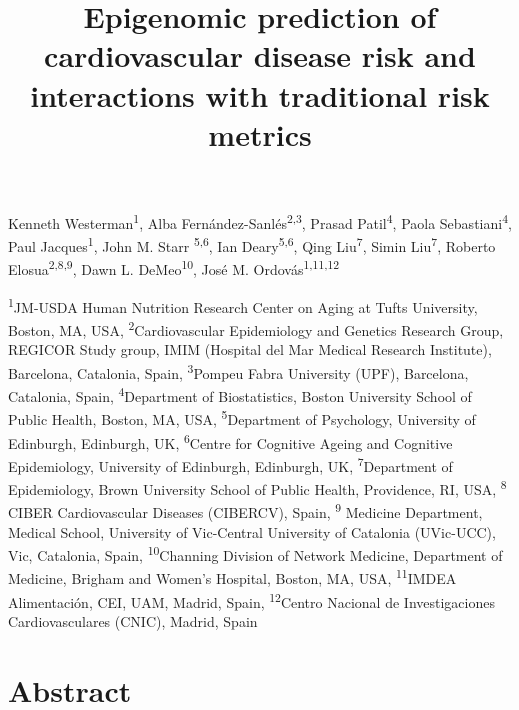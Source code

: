 \documentclass[]{article}
\title{Epigenomic prediction of cardiovascular disease risk and interactions
with traditional risk metrics}
\author{}
\date{}
\begin{document}
\maketitle

Kenneth Westerman\textsuperscript{1}, Alba
Fernández-Sanlés\textsuperscript{2,3}, Prasad Patil\textsuperscript{4},
Paola Sebastiani\textsuperscript{4}, Paul Jacques\textsuperscript{1},
John M. Starr \textsuperscript{5,6}, Ian Deary\textsuperscript{5,6},
Qing Liu\textsuperscript{7}, Simin Liu\textsuperscript{7}, Roberto
Elosua\textsuperscript{2,8,9}, Dawn L. DeMeo\textsuperscript{10}, José
M. Ordovás\textsuperscript{1,11,12}

\textsuperscript{1}JM-USDA Human Nutrition Research Center on Aging at
Tufts University, Boston, MA, USA, \textsuperscript{2}Cardiovascular
Epidemiology and Genetics Research Group, REGICOR Study group, IMIM
(Hospital del Mar Medical Research Institute), Barcelona, Catalonia,
Spain, \textsuperscript{3}Pompeu Fabra University (UPF), Barcelona,
Catalonia, Spain, \textsuperscript{4}Department of Biostatistics, Boston
University School of Public Health, Boston, MA, USA,
\textsuperscript{5}Department of Psychology, University of Edinburgh,
Edinburgh, UK, \textsuperscript{6}Centre for Cognitive Ageing and
Cognitive Epidemiology, University of Edinburgh, Edinburgh, UK,
\textsuperscript{7}Department of Epidemiology, Brown University School
of Public Health, Providence, RI, USA, \textsuperscript{8} CIBER
Cardiovascular Diseases (CIBERCV), Spain, \textsuperscript{9} Medicine
Department, Medical School, University of Vic-Central University of
Catalonia (UVic-UCC), Vic, Catalonia, Spain,
\textsuperscript{10}Channing Division of Network Medicine, Department of
Medicine, Brigham and Women's Hospital, Boston, MA, USA,
\textsuperscript{11}IMDEA Alimentación, CEI, UAM, Madrid, Spain,
\textsuperscript{12}Centro Nacional de Investigaciones Cardiovasculares
(CNIC), Madrid, Spain

\hypertarget{abstract}{%
\section{Abstract}\label{abstract}}
\end{document}
